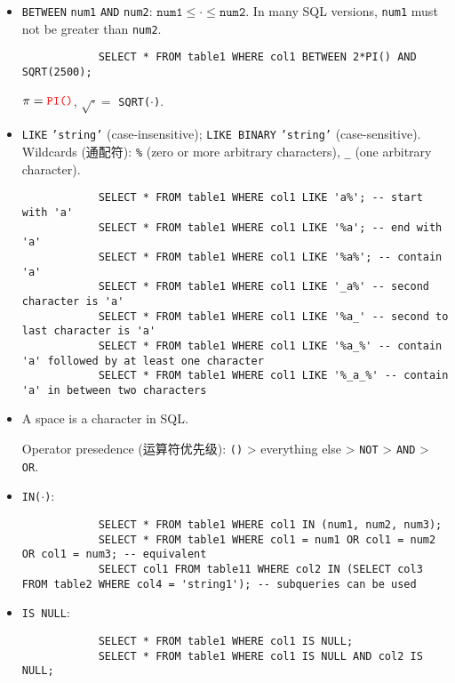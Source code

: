\documentclass{article}
\begin{document}
	\begin{itemize}
		\item \texttt{\color{red}BETWEEN} \texttt{num1} \texttt{\color{red}AND} \texttt{num2}: $\texttt{num1}\leq\cdot\leq\texttt{num2}$. In many SQL versions, \texttt{num1} must not be greater than \texttt{num2}.
		
		\begin{lstlisting}
			SELECT * FROM table1 WHERE col1 BETWEEN 2*PI() AND SQRT(2500);
		\end{lstlisting}
		$\pi=\texttt{\color{red}PI()}$, $\sqrt{\cdot} =$ \texttt{\color{red}SQRT($\cdot$)}.
		
		\item \texttt{\color{red}LIKE} \texttt{'string'} (case-insensitive); \texttt{\color{red}LIKE BINARY} \texttt{'string'} (case-sensitive). \\
		Wildcards (通配符): \texttt{\color{red}\%} (zero or more arbitrary characters), \texttt{\color{red}\_} (one arbitrary character).
		
		\begin{lstlisting}
			SELECT * FROM table1 WHERE col1 LIKE 'a%'; -- start with 'a'
			SELECT * FROM table1 WHERE col1 LIKE '%a'; -- end with 'a'
			SELECT * FROM table1 WHERE col1 LIKE '%a%'; -- contain 'a'
			SELECT * FROM table1 WHERE col1 LIKE '_a%' -- second character is 'a'
			SELECT * FROM table1 WHERE col1 LIKE '%a_' -- second to last character is 'a'
			SELECT * FROM table1 WHERE col1 LIKE '%a_%' -- contain 'a' followed by at least one character
			SELECT * FROM table1 WHERE col1 LIKE '%_a_%' -- contain 'a' in between two characters
		\end{lstlisting}
		
		\item A space is a character in SQL.
		
		Operator presedence (运算符优先级): \texttt{\color{red}()} > everything else > \texttt{\color{red}NOT} > \texttt{\color{red}AND} > \texttt{\color{red}OR}.
		
		\item \texttt{\color{red}IN($\cdot$)}:
		
		\begin{lstlisting}
			SELECT * FROM table1 WHERE col1 IN (num1, num2, num3);
			SELECT * FROM table1 WHERE col1 = num1 OR col1 = num2 OR col1 = num3; -- equivalent
			SELECT col1 FROM table11 WHERE col2 IN (SELECT col3 FROM table2 WHERE col4 = 'string1'); -- subqueries can be used
		\end{lstlisting}
		
		\item \texttt{\color{red}IS NULL}:
		\begin{lstlisting}
			SELECT * FROM table1 WHERE col1 IS NULL;
			SELECT * FROM table1 WHERE col1 IS NULL AND col2 IS NULL;
		\end{lstlisting}
	\end{itemize}
	
\end{document}
